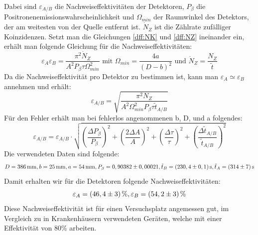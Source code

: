        Dabei sind $\varepsilon_{A/B}$ die Nachweiseffektivitäten der Detektoren, $P_\beta$ die Positronenemissionswahrscheinlichkeit und $\Omega_{min}$ der Raumwinkel des Detektors, der am weitesten von der Quelle entfernt
       ist. $\dot N_Z$ ist die Zählrate zufälliger Koinzidenzen. Setzt man die Gleichungen \ref{dff:NK} und \ref{dff:NZ} ineinander ein, erhält man folgende Gleichung für die Nachweiseffektivitäten:
       $$ \varepsilon_A \varepsilon_B = \frac{\pi^2 \dot N_Z}{A^2 P_\beta \tau \Omega^2_{min}} \text{ mit } \Omega_{min} = \frac{4a}{\left(D-b\right)^2 } \text{ und } \dot N_Z = \frac{N_Z}{\tilde t}$$
       Da die Nachweiseffektivität pro Detektor zu bestimmen ist, kann man $ \varepsilon_A \simeq \varepsilon_B $ annehmen und erhält:
       $$ \varepsilon_{A/B} = \sqrt{\frac{\pi^2 N_Z}{A^2 \Omega^2_{min} P_\beta \tau \tilde t_{A/B}}}$$ 
       Für den Fehler erhält man bei fehlerlos angenommenen b, D, und a folgendes:
       $$ \varepsilon_{A/B} = \varepsilon_{A/B} \cdot\sqrt{\left(\frac{\Delta P_\beta}{P_\beta}\right)^2+ \left(\frac{2\Delta A}{A}\right)^2 + \left(\frac{\Delta \tau}{\tau}\right)^2+ \left(\frac{\Delta \tilde t_{A/B}}{\tilde t_{A/B}}\right)^2}$$
       Die verwendeten Daten sind folgende:
       $$ D = \unit[386]{mm}, b = \unit[25]{mm}, a = \unit[54]{mm}, P_\beta = 0,90382 \pm 0,00021, \tilde t_B = \unit[(230,4 \pm 0,1)]{s} , \tilde t_A = \unit[(314\pm7)]{s}$$
       Damit erhalten wir für die Detektoren folgende Nachweiseffektivitäten:
       $$ \varepsilon_A = \unit[(46,4\pm 3)]{\%}, \varepsilon_B = \unit[(54,2\pm 3)]{\%}$$
       Diese Nachweiseffektivität ist für einen Versuchsplatz angemessen gut, im Vergleich zu in Krankenhäusern verwendeten Geräten, welche mit einer Effektivität von 80\% arbeiten.

